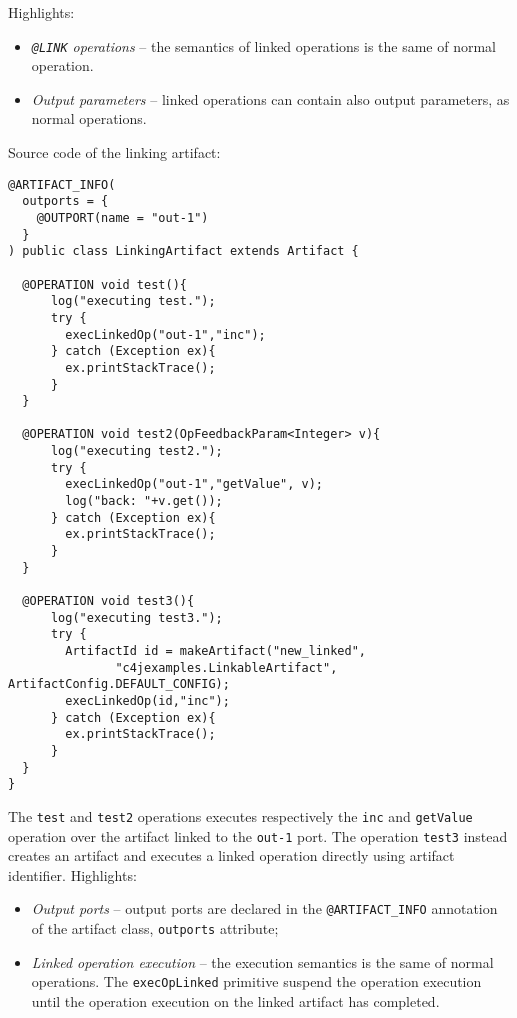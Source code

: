 \documentclass[11pt]{report}
\newcommand\code[1]{{\small{\mbox{\texttt{{#1}}}}}}
\begin{document}
\noindent Highlights:
%
\begin{itemize}
%
\item \emph{\code{@LINK} operations} -- the semantics of linked operations is the same of normal operation.
\item \emph{Output parameters} -- linked operations can contain also output parameters, as normal operations.
%
\end{itemize} 

\noindent Source code of the linking artifact:

%
{\small{\begin{verbatim}
@ARTIFACT_INFO(
  outports = {
    @OUTPORT(name = "out-1")
  }
) public class LinkingArtifact extends Artifact {
  
  @OPERATION void test(){
      log("executing test.");
      try {
        execLinkedOp("out-1","inc");
      } catch (Exception ex){
        ex.printStackTrace();
      }
  }

  @OPERATION void test2(OpFeedbackParam<Integer> v){
      log("executing test2.");
      try {
        execLinkedOp("out-1","getValue", v);
        log("back: "+v.get());
      } catch (Exception ex){
        ex.printStackTrace();
      }
  }

  @OPERATION void test3(){
      log("executing test3.");
      try {
        ArtifactId id = makeArtifact("new_linked", 
               "c4jexamples.LinkableArtifact", ArtifactConfig.DEFAULT_CONFIG);
        execLinkedOp(id,"inc");
      } catch (Exception ex){
        ex.printStackTrace();
      }
  }
}
\end{verbatim}}}
%
\noindent The \code{test} and \code{test2} operations executes respectively the \code{inc} and \code{getValue} operation over the artifact linked to the \code{out-1} port.
%
The operation \code{test3} instead creates an artifact and executes a linked operation directly using artifact identifier.
\noindent Highlights:
%
\begin{itemize}
%
\item \emph{Output ports} -- output ports are declared in the \code{@ARTIFACT\_INFO} annotation of the artifact class, \code{outports} attribute;
%
\item \emph{Linked operation execution} -- the execution semantics is the same of normal operations.
%
The \code{execOpLinked} primitive suspend the operation execution until the operation execution on the linked artifact has completed.
%

\end{itemize} 
%
\end{document}
